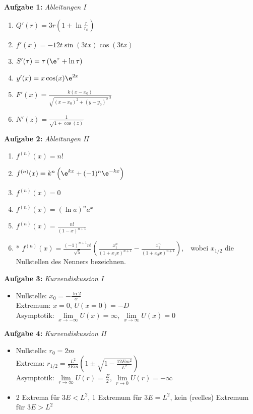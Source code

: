 
\textbf{Aufgabe 1: } \emph{Ableitungen I}
\begin{enumerate}[label=(\alph*)]
\item $Q'(r)=3r\left(1+\ln\frac{r}{r_0}\right)$
\item $f'(x)=-12t\sin(3tx)\cos(3tx)$
\item $S'(\tau)=\tau\left(\e^{\tau}+\ln\tau\right)$
\item $y'(x)=x\cos(x)\e^{2x}$
\item $F'(x)=\frac{k(x-x_0)}{\sqrt{(x-x_0)^2+(y-y_0)^2}^{\ \!3}}$
\item $N'(z)=\frac{1}{\sqrt{1+\cos(z)}}$
\end{enumerate}
\vspace{0.7cm}
%
\textbf{Aufgabe 2: } \emph{Ableitungen II}
\begin{enumerate}[label=(\alph*)]
\item $f^{(n)}(x)=n!$
\item $f^{(n)}(x)=k^n\left(\e^{kx}+(-1)^n\e^{-kx}\right)$
\item $f^{(n)}(x)=0$
\item $f^{(n)}(x)=\left(\ln a\right)^n a^x$
\item $f^{(n)}(x)=\frac{n!}{(1-x)^{n+1}}$
\item* $f^{(n)}(x)=\frac{(-1)^{n+1} n!}{\sqrt{5}}\left(\frac{x_1^n}{(1+x_1x)^{n+1}}-\frac{x_2^n}{(1+x_2x)^{n+1}}\right)$,\ \ wobei $x_{1/2}$ die Nullstellen des Nenners bezeichnen.
\end{enumerate}
\vspace{0.7cm}
%
\newpage
\textbf{Aufgabe 3: } \emph{Kurvendiskussion I}
\begin{itemize}
\item Nullstelle: $x_0=-\frac{\ln 2}{\alpha}$\\[0.2cm]
Extremum: $x=0$, $U(x=0)=-D$\\[0.2cm]
Asymptotik: $\lim\limits_{x\rightarrow -\infty}U(x)=\infty$, $\lim\limits_{x\rightarrow \infty}U(x)=0$\\
\end{itemize}
\vspace{1cm}
%
\textbf{Aufgabe 4: } \emph{Kurvendiskussion II}
\begin{itemize}
\item Nullstelle: $r_0=2m$\\[0.2cm]
Extrema: $r_{1/2}=\frac{L^2}{2Em}\left(1\pm\sqrt{1-\frac{12Em^2}{L^2}}\right)$\\[0.2cm]
Asymptotik: $\lim\limits_{r\rightarrow\infty}U(r)=\frac{E}{2}$, $\lim\limits_{r\rightarrow 0}U(r)=-\infty$
\item 2 Extrema für $3E<L^2$, 1 Extremum für $3E=L^2$, kein (reelles) Extremum für $3E>L^2$
\end{itemize}
